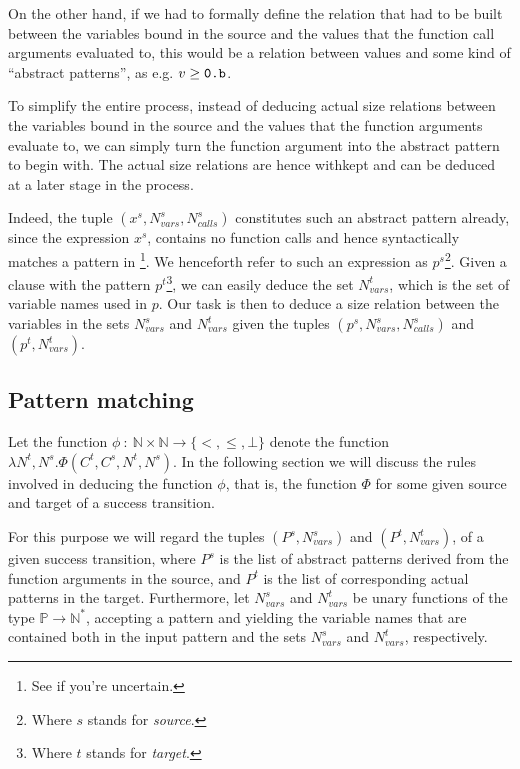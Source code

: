 On the other hand, if we had to formally define the relation that had to be
built between the variables bound in the source and the values that the
function call arguments evaluated to, this would be a relation between values
and some kind of ``abstract patterns'', as e.g. $v\geq\text{{\ttfamily0.b}}$.

To simplify the entire process, instead of deducing actual size relations
between the variables bound in the source and the values that the function
arguments evaluate to, we can simply turn the function argument into the
abstract pattern to begin with. The actual size relations are hence withkept
and can be deduced at a later stage in the process.

Indeed, the tuple $(x^s,N_{vars}^s,N_{calls}^s)$ constitutes such an abstract
pattern already, since the expression $x^s$, contains no function calls and
hence syntactically matches a pattern in \D{}\footnote{See
 if you're uncertain.}. We henceforth refer to such an
expression as $p^s$\footnote{Where $s$ stands for \emph{source}.}. Given a
clause with the pattern $p^t$\footnote{Where $t$ stands for \emph{target}.}, we
can easily deduce the set $N_{vars}^t$, which is the set of variable names used
in $p$. Our task is then to deduce a size relation between the variables in the
sets $N_{vars}^s$ and $N_{vars}^t$ given the tuples
$(p^s,N_{vars}^s,N_{calls}^s)$ and $(p^t,N_{vars}^t)$.

\subsection{Pattern matching}

Let the function $\phi\ :\ \mathbb{N} \times \mathbb{N} \rightarrow
\{<,\leq,\bot\}$ denote the function $\lambda N^t, N^s .
\Phi\left(C^t,C^s,N^t,N^s\right)$. In the following section we will discuss the
rules involved in deducing the function $\phi$, that is, the function $\Phi$
for some given source and target of a success transition.

For this purpose we will regard the tuples $(P^s,N_{vars}^s)$ and
$(P^t,N_{vars}^t)$, of a given success transition, where $P^s$ is the list of
abstract patterns derived from the function arguments in the source, and $P^t$
is the list of corresponding actual patterns in the target. Furthermore, let
$N_{vars}^s$ and $N_{vars}^t$ be unary functions of the type
$\mathbb{P}\rightarrow\mathbb{N}^*$, accepting a pattern and yielding the
variable names that are contained both in the input pattern and the sets
$N_{vars}^s$ and $N_{vars}^t$, respectively.

